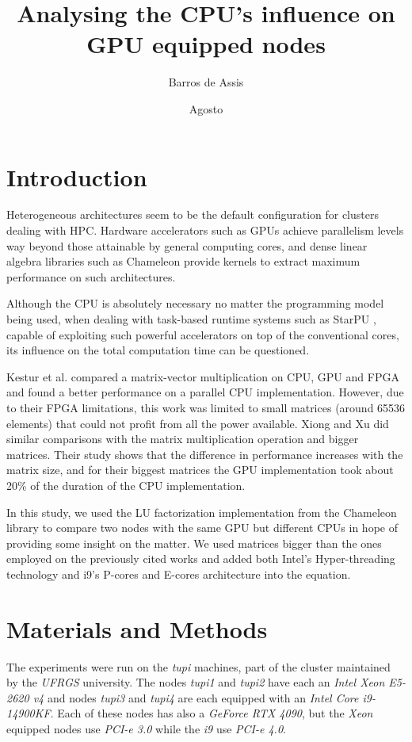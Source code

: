 \documentclass[ppgc,english]{iiufrgs}
\author{Barros de Assis}{Lucas}
\date{Agosto}{2024}
\title{Analysing the CPU's influence on GPU equipped nodes}
\begin{document}
\maketitle

\chapter{Introduction}
\label{sec:org4420b40}

Heterogeneous architectures seem to be the default configuration for clusters dealing with HPC. Hardware accelerators such as
GPUs achieve parallelism levels way beyond those attainable by general computing cores, and dense linear algebra libraries such
as Chameleon \cite{chameleon} provide kernels to extract maximum performance on such architectures.

Although the CPU is absolutely necessary no matter the programming model being used, when dealing with task-based runtime systems
such as StarPU \cite{starpu}, capable of exploiting such powerful accelerators on top of the conventional cores, its influence on the
total computation time can be questioned.

Kestur et al. \cite{kestur} compared a matrix-vector multiplication on CPU, GPU and FPGA and
found a better performance on a parallel CPU implementation. However, due to their FPGA limitations, this work was limited to small
matrices (around 65536 elements) that could not profit from all the power available. Xiong and Xu \cite{xiong} did similar comparisons
with the matrix multiplication operation and bigger matrices. Their study shows that the difference in performance increases with
the matrix size, and for their biggest matrices the GPU implementation took about 20\% of the duration of the CPU implementation.

In this study, we used the LU factorization implementation from the Chameleon library to compare two nodes with the same GPU but different
CPUs in hope of providing some insight on the matter. We used matrices bigger than the ones employed on the previously cited works and
added both Intel's Hyper-threading technology and i9's P-cores and E-cores architecture into the equation.

\chapter{Materials and Methods}
\label{sec:org4bcf267}
The experiments were run on the \emph{tupi} machines, part of the cluster maintained by the \emph{UFRGS} university.
The nodes \emph{tupi1} and \emph{tupi2} have each an \emph{Intel Xeon E5-2620 v4} and nodes \emph{tupi3} and \emph{tupi4} are each equipped with
an \emph{Intel Core i9-14900KF}. Each of these nodes has also a \emph{GeForce RTX 4090}, but the \emph{Xeon} equipped nodes use
\emph{PCI-e 3.0} while the \emph{i9} use \emph{PCI-e 4.0}.
\end{document}
